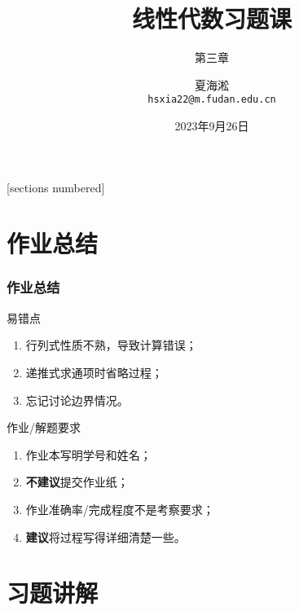 \documentclass[10pt,xcolor=svgnames]{beamer} %
\title{线性代数习题课}
\author[夏海淞]{夏海淞\\ \texttt{hsxia22@m.fudan.edu.cn}}
\subtitle{第三章}
\institute[复旦大学]{计算机科学技术学院\\ 复旦大学}
\date[2023/9/21]{2023年9月26日}
\begin{document}
{
\maketitle
}%


\begin{frame}
    [sections numbered] %
    \tableofcontents[hideallsubsections] %
\end{frame}

\section{作业总结}

\begin{frame}
    \frametitle{作业总结}
    \begin{block}{易错点}
        \begin{enumerate}
            \item 行列式性质不熟，导致计算错误；
            \item 递推式求通项时省略过程；
            \item 忘记讨论边界情况。
        \end{enumerate}
    \end{block}
    \pause
    \begin{block}{作业/解题要求}
        \begin{enumerate}
            \item 作业本写明学号和姓名；
            \item \textbf{不建议}提交作业纸；
            \item 作业准确率/完成程度不是考察要求；
            \item \textbf{建议}将过程写得详细清楚一些。
        \end{enumerate}
    \end{block}
\end{frame}

\section{习题讲解}
\end{document}
